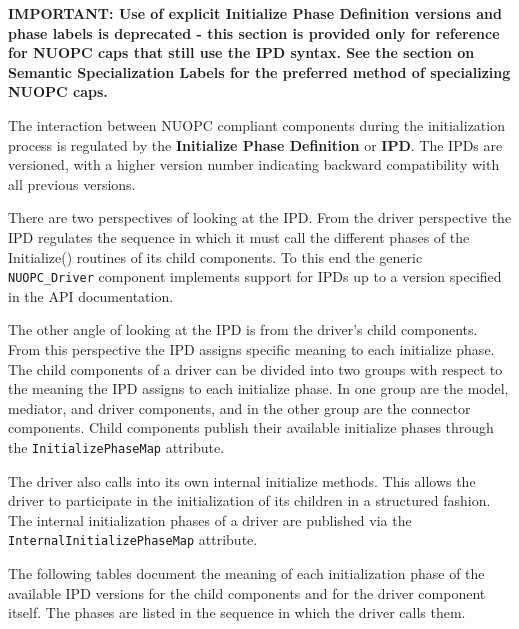%

\label{IPD}

{\bf IMPORTANT:  Use of explicit Initialize Phase Definition versions and phase labels is deprecated - this section is provided only for reference for NUOPC caps that still use the IPD syntax.  See the section on Semantic Specialization Labels for the preferred method of specializing NUOPC caps.}

The interaction between NUOPC compliant components during the initialization process is regulated by the {\bf Initialize Phase Definition} or {\bf IPD}. The IPDs are versioned, with a higher version number indicating backward compatibility with all previous versions.

There are two perspectives of looking at the IPD. From the driver perspective the IPD regulates the sequence in which it must call the different phases of the Initialize() routines of its child components. To this end the generic {\tt NUOPC\_Driver} component implements support for IPDs up to a version specified in the API documentation.

The other angle of looking at the IPD is from the driver's child components. From this perspective the IPD assigns specific meaning to each initialize phase. The child components of a driver can be divided into two groups with respect to the meaning the IPD assigns to each initialize phase. In one group are the model, mediator, and driver components, and in the other group are the connector components. Child components publish their available initialize phases through the {\tt InitializePhaseMap} attribute.

The driver also calls into its own internal initialize methods. This allows the driver to participate in the initialization of its children in a structured fashion. The internal initialization phases of a driver are published via the {\tt InternalInitializePhaseMap} attribute.

The following tables document the meaning of each initialization phase of the available IPD versions for the child components and for the driver component itself. The phases are listed in the sequence in which the driver calls them.
\newline

